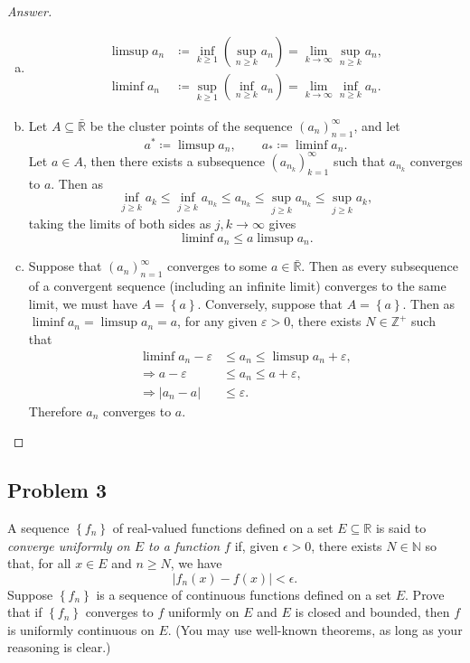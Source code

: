\documentclass[12pt]{article}
\newcommand{\n}{\mathbb{N}}
\newcommand{\z}{\mathbb{Z}}
\newcommand{\real}{\mathbb{R}}
\newcommand{\ita}[1]{\textit{#1}}
\newcommand\paren[1]{\left( #1 \right)}
\newcommand\setb[1]{\left \{ #1 \right \}}
\newcommand{\abs}[1]{\left | #1 \right |}
\newcommand{\eps}{\varepsilon}
\theoremstyle{definition}
\begin{document}
\begin{proof}[Answer]
    \noindent 
    \begin{enumerate}[(a)]
        \item 
        \begin{align*}
            \limsup a_n & \coloneqq \inf\limits_{k \geq 1} \paren{ \sup\limits_{n \geq k} a_n } = \lim\limits_{k \to \infty} \sup\limits_{n \geq k} a_n , \\ 
            \liminf a_n & \coloneqq  \sup\limits_{k \geq 1} \paren{ \inf\limits_{n \geq k} a_n } = \lim\limits_{k \to \infty} \inf\limits_{n \geq k} a_n . 
        \end{align*}
        \item Let $A \subseteq \bar{\real}$ be the cluster points of the sequence $\paren{ a_n }_{n = 1}^{\infty}$, and let 
        \[
            a^* \coloneqq \limsup a_n , \qquad a_* \coloneqq \liminf a_n . 
        \]
        Let $a \in A$, then there exists a subsequence $\paren{ a_{n_k} }_{k = 1}^{\infty}$ such that $a_{n_k}$ converges to $a$. Then as 
        \[
            \inf\limits_{j \geq k} a_k \leq \inf\limits_{j \geq k} a_{n_k} \leq a_{n_k} \leq \sup\limits_{j \geq k} a_{n_k} \leq \sup\limits_{j \geq k} a_k , 
        \]
        taking the limits of both sides as $j,k \to \infty$ gives 
        \[
            \liminf a_n \leq a \limsup a_n . 
        \]
        \item Suppose that $\paren{ a_n }_{n = 1}^{\infty}$ converges to some $a \in \bar{\real}$. Then as every subsequence of a convergent sequence (including an infinite limit) converges to the same limit, we must have $A = \setb{ a }$. Conversely, suppose that $A = \setb{ a }$. Then as $\liminf a_n = \limsup a_n = a$, for any given $\eps > 0$, there exists $N \in \z^+$ such that 
        \begin{align*}
            \liminf a_n - \eps & \leq a_n \leq \limsup a_n + \eps , \\ 
            \Rightarrow a - \eps & \leq a_n \leq a + \eps , \\ 
            \Rightarrow \abs{ a_n - a } & \leq \eps . 
        \end{align*}
        Therefore $a_n$ converges to $a$. 
    \end{enumerate}
\end{proof}

\subsection{Problem 3}
A sequence $\setb{ f_n }$ of real-valued functions defined on a set $E \subseteq \real$ is said to \ita{converge uniformly on $E$ to a function $f$} if, given $\epsilon > 0$, there exists $N \in \n$ so that, for all $x \in E$ and $n \geq N$, we have 
\[
    \abs{ f_n(x) - f(x) } < \epsilon. 
\]
Suppose $\setb{ f_n }$ is a sequence of continuous functions defined on a set $E$. Prove that if $\setb{ f_n }$ converges to $f$ uniformly on $E$ and $E$ is closed and bounded, then $f$ is uniformly continuous on $E$. (You may use well-known theorems, as long as your reasoning is clear.)
\end{document}
